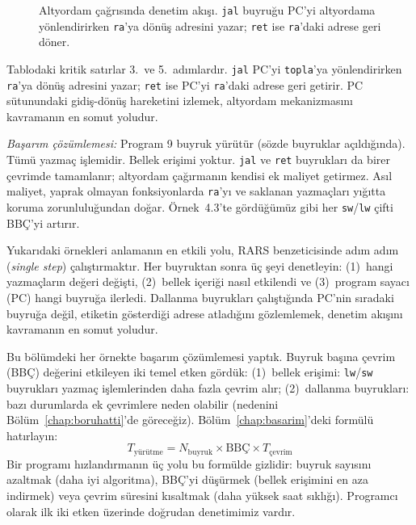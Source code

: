 \begin{ornek}[4.6]
\begin{figure}[H]
\caption[Altyordam çağrısında denetim akışı]{Altyordam çağrısında denetim akışı. \texttt{jal} buyruğu PC'yi altyordama yönlendirirken \texttt{ra}'ya dönüş adresini yazar; \texttt{ret} ise \texttt{ra}'daki adrese geri döner.}
\label{fig:altyordam-akis}
\end{figure}

Tablodaki kritik satırlar 3.~ve 5.~adımlardır. \texttt{jal} PC'yi \texttt{topla}'ya yönlendirirken \texttt{ra}'ya dönüş adresini yazar; \texttt{ret} ise PC'yi \texttt{ra}'daki adrese geri getirir. PC sütunundaki gidiş-dönüş hareketini izlemek, altyordam mekanizmasını kavramanın en somut yoludur.

\emph{Başarım çözümlemesi:} Program 9 buyruk yürütür (sözde buyruklar açıldığında). Tümü yazmaç işlemidir. Bellek erişimi yoktur. \texttt{jal} ve \texttt{ret} buyrukları da birer çevrimde tamamlanır; altyordam çağırmanın kendisi ek maliyet getirmez. Asıl maliyet, yaprak olmayan fonksiyonlarda \texttt{ra}'yı ve saklanan yazmaçları yığıtta koruma zorunluluğundan doğar. Örnek~4.3'te gördüğümüz gibi her \texttt{sw}/\texttt{lw} çifti BBÇ'yi artırır.
\end{ornek}

\begin{bilginot}
Yukarıdaki örnekleri anlamanın en etkili yolu, RARS benzeticisinde adım adım (\emph{single step}) çalıştırmaktır. Her buyruktan sonra üç şeyi denetleyin: (1)~hangi yazmaçların değeri değişti, (2)~bellek içeriği nasıl etkilendi ve (3)~program sayacı (PC) hangi buyruğa ilerledi. Dallanma buyrukları çalıştığında PC'nin sıradaki buyruğa değil, etiketin gösterdiği adrese atladığını gözlemlemek, denetim akışını kavramanın en somut yoludur.
\end{bilginot}

\begin{bilginot}
Bu bölümdeki her örnekte başarım çözümlemesi yaptık. Buyruk başına çevrim (BBÇ) değerini etkileyen iki temel etken gördük: (1)~bellek erişimi: \texttt{lw}/\texttt{sw} buyrukları yazmaç işlemlerinden daha fazla çevrim alır; (2)~dallanma buyrukları: bazı durumlarda ek çevrimlere neden olabilir (nedenini Bölüm~\ref{chap:boruhatti}'de göreceğiz). Bölüm~\ref{chap:basarim}'deki formülü hatırlayın:
\[
T_{\text{yürütme}} = N_{\text{buyruk}} \times \text{BBÇ} \times T_{\text{çevrim}}
\]
Bir programı hızlandırmanın üç yolu bu formülde gizlidir: buyruk sayısını azaltmak (daha iyi algoritma), BBÇ'yi düşürmek (bellek erişimini en aza indirmek) veya çevrim süresini kısaltmak (daha yüksek saat sıklığı). Programcı olarak ilk iki etken üzerinde doğrudan denetimimiz vardır.
\end{bilginot}

